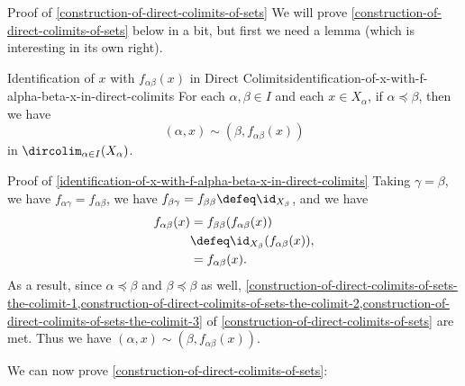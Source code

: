 \begin{Proof}{Proof of \cref{construction-of-direct-colimits-of-sets}}%
    We will prove \cref{construction-of-direct-colimits-of-sets} below in a bit, but first we need a lemma (which is interesting in its own right).
\end{Proof}
\begin{lemma}{Identification of $x$ with $f_{\alpha\beta}(x)$ in Direct Colimits}{identification-of-x-with-f-alpha-beta-x-in-direct-colimits}%
    For each $\alpha,\beta\in I$ and each $x\in X_{\alpha}$, if $\alpha\preceq\beta$, then we have
    \[
        (\alpha,x)%
        \sim%
        (\beta,f_{\alpha\beta}(x))%
    \]%
    in $\displaystyle\dircolim_{\alpha\in I}(X_{\alpha})$.
\end{lemma}
\begin{Proof}{Proof of \cref{identification-of-x-with-f-alpha-beta-x-in-direct-colimits}}%
    Taking $\gamma=\beta$, we have $f_{\alpha\gamma}=f_{\alpha\beta}$, we have $f_{\beta\gamma}=f_{\beta\beta}\defeq\id_{X_{\beta}}$, and we have
    \begin{align*}
        f_{\alpha\beta}(x) &=      f_{\beta\beta}(f_{\alpha\beta}(x))\\%
                           &\defeq \id_{X_{\beta}}(f_{\alpha\beta}(x)),\\%
                           &=      f_{\alpha\beta}(x).%
    \end{align*}
    As a result, since $\alpha\preceq\beta$ and $\beta\preceq\beta$ as well, \cref{construction-of-direct-colimits-of-sets-the-colimit-1,construction-of-direct-colimits-of-sets-the-colimit-2,construction-of-direct-colimits-of-sets-the-colimit-3} of \cref{construction-of-direct-colimits-of-sets} are met. Thus we have $(\alpha,x)\sim(\beta,f_{\alpha\beta}(x))$.
\end{Proof}
We can now prove \cref{construction-of-direct-colimits-of-sets}:
